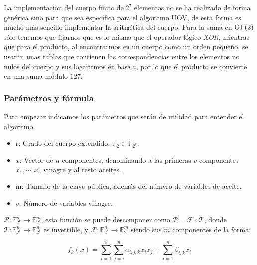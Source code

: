 La implementación del cuerpo finito de $2^7$ elementos no se ha realizado de forma genérica sino para que sea específica para el algoritmo UOV, de esta forma es mucho más sencillo implementar la aritmética del cuerpo. Para la suma en $\operatorname{GF}(2)$ sólo tenemos que fijarnos que es lo mismo que el operador lógico \textit{XOR}, mientras que para el producto, al encontrarmos en un cuerpo como un orden pequeño, se usarán unas tablas que contienen las correspondencias entre los elementos no nulos del cuerpo y sus logaritmos en base $a$, por lo que el producto se convierte en una suma módulo $127$.\\




\subsubsection{Parámetros y fórmula}
Para empezar indicamos los parámetros que serán de utilidad para entender el algoritmo.
\begin{itemize}
	\item r: Grado del cuerpo extendido, $\mathds{F}_2 \subset \mathds{F}_{2^r}$. %
	\item $x$: Vector de $n$ componentes, denominando a las primeras $v$ componentes  $x_1, \dotsb, x_v$ vinagre y al resto aceites.
	
	\item m: Tamaño de la clave pública, además del número de variables de aceite.
	\item $v$: Número de variables vinagre.
\end{itemize}

$\mathcal{P}: \mathds{F}_{2^r}^n \rightarrow \mathds{F}_{2^r}^m$, esta función se puede descomponer como $\mathcal{P} = \mathcal{F} \circ \mathcal{T}$, donde $\mathcal{T}: \mathds{F}_{2^r}^n \rightarrow \mathds{F}_{2^r}^n$ es invertible, y $\mathcal{F}: \mathds{F}_{2^r}^n \rightarrow \mathds{F}_{2^r}^m$ siendo sus $m$ componentes de la forma:

\begin{equation}\label{eq:fun}
f_k(x) = \sum_{i=1}^v \sum_{j=i}^n \alpha_{i,j,k} x_i x_j + \sum_{i=1}^n \beta_{i,k} x_i
\end{equation}

